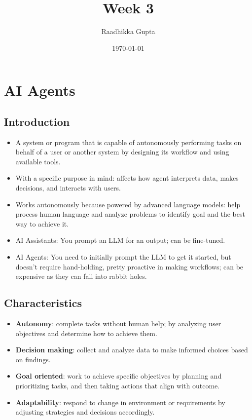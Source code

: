 \documentclass[12pt, letterpaper]{article}
\title{Week 3}
\author{Raadhikka Gupta}
\date{\today}
\begin{document}
\maketitle

\section{AI Agents}
\subsection{Introduction}
\begin{itemize}
    \item A system or program that is capable of autonomously performing tasks on behalf of a user or another system by designing its workflow and using available tools.
    \item With a specific purpose in mind: affects how agent interprets data, makes decisions, and interacts with users.
    \item Works autonomously because powered by advanced language models: help process human language and analyze problems to identify goal and the best way to achieve it.
    \item AI Assistants: You prompt an LLM for an output; can be fine-tuned. 
    \item AI Agents: You need to initially prompt the LLM to get it started, but doesn't require hand-holding, pretty proactive in making workflows; can be expensive as they can fall into rabbit holes.
\end{itemize}

\subsection{Characteristics}
\begin{itemize}
    \item \textbf{Autonomy}: complete tasks without human help; by analyzing user objectives and determine how to achieve them.
    \item \textbf{Decision making}: collect and analyze data to make informed choices based on findings.
    \item \textbf{Goal oriented}: work to achieve specific objectives by planning and prioritizing tasks, and then taking actions that align with outcome.
    \item \textbf{Adaptability}: respond to change in environment or requirements by adjusting strategies and decisions accordingly.
\end{itemize}
\end{document}
